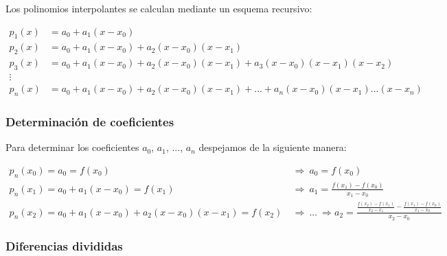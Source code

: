 \documentclass{article}
\begin{document}
Los polinomios interpolantes se calculan mediante un esquema recursivo:

\begin{align*}
    p_1(x) &= a_0 + a_1(x-x_0) \\
    p_2(x) &= a_0 + a_1(x-x_0) + a_2(x-x_0)(x-x_1) \\
    p_3(x) &= a_0 + a_1(x-x_0) + a_2(x-x_0)(x-x_1) + a_3(x-x_0)(x-x_1)(x-x_2) \\
    \vdots \\
    p_n(x) &= a_0 + a_1(x-x_0) + a_2(x-x_0)(x-x_1) + ... + a_n(x-x_0)(x-x_1)...(x-x_n)
\end{align*}

\subsubsection{Determinación de coeficientes}

Para determinar los coeficientes $a_0$, $a_1$, ..., $a_n$ despejamos de la 
siguiente manera:

\begin{align*}
    p_n(x_0) = a_0 = f(x_0)\ &\Rightarrow\ a_0 = f(x_0) \\
    p_n(x_1) = a_0 + a_1(x-x_0) = f(x_1)\ &\Rightarrow\ a_1 = \frac{f(x_1) - f(x_0)}{x_1 - x_0} \\
    p_n(x_2) = a_0 + a_1(x-x_0) + a_2(x-x_0)(x-x_1) = f(x_2)\ &\Rightarrow\ ...\ \Rightarrow a_2 = \frac{\frac{f(x_2) - f(x_1)}{x_2-x_1} - \frac{f(x_1) - f(x_0)}{x_1 - x_0}}{x_2 - x_0}
\end{align*}

\subsubsection{Diferencias divididas}
\end{document}
